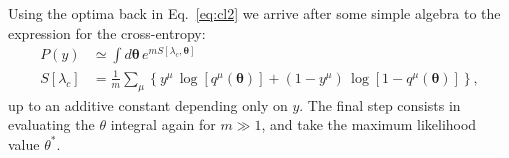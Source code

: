 \documentclass{article}
\begin{document}
%
Using the optima back in Eq.~\eqref{eq:cl2} we arrive after some simple algebra to the expression for the cross-entropy:
%
\begin{align} \label{eq:cl3}
P(y) &\simeq \int d\boldsymbol{\theta} \, e^{m S[\lambda_c, \boldsymbol{\theta}]} \\ \nonumber
S[\lambda_c] &= \frac{1}{m} \sum_{\mu} \left\{ y^{\mu} \, \log [ q^{\mu}( \boldsymbol{\theta} ) ] + (1-y^{\mu}) \, \log [1-q^{\mu}( \boldsymbol{\theta}) ] \right\},
\end{align}
%
up to an additive constant depending only on $y$. The final step consists in evaluating the $\theta$ integral again for $m \gg 1$, and take the maximum likelihood value $\theta^*$.





\end{document}
